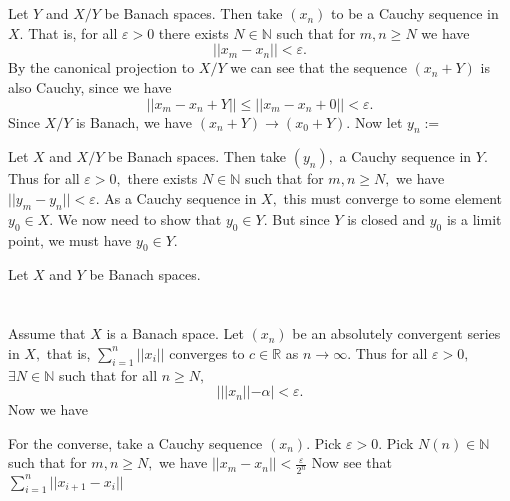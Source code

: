 \documentclass{article}
\begin{document}
\section{} %
Let $Y$ and $X/Y$ be Banach spaces. Then take $(x_n)$ to be a Cauchy sequence in $X.$ That is, for all $\varepsilon > 0$ there exists $N \in \mathbb{N}$ 
such that for $m,n \geq N$ we have $$||x_m-x_n||< \varepsilon.$$
By the canonical projection to $X/Y$ we can see that the sequence $(x_n+Y)$ is also Cauchy, since we have $$||x_m-x_n +Y|| \leq ||x_m-x_n+0|| < \varepsilon. 
$$ Since $X/Y$ is Banach, we have $(x_n+Y) \to (x_0+Y).$ Now let $y_n:= $ 

Let $X$ and $X/Y$ be Banach spaces. Then take $(y_n),$ a Cauchy sequence in $Y.$ Thus for all $\varepsilon > 0,$ there exists $N \in \mathbb{N}$ such that 
for $m,n \geq N,$ we have $||y_m-y_n||< \varepsilon.$ As a Cauchy sequence in $X,$ this must converge to some element $y_0 \in X.$ We now need to show that 
$y_0 \in Y.$ But since $Y$ is closed and $y_0$ is a limit point, we must have $y_0 \in Y.$

Let $X$ and $Y$ be Banach spaces. 
\section{} %
Assume that $X$ is a Banach space. Let $(x_n)$ be an absolutely convergent series in $X,$ that is, $\sum_{i=1}^n||x_i||$ converges to $c \in \mathbb{R}$ as 
$n \to \infty.$ Thus  
for all $\varepsilon > 0,$ $\exists N \in \mathbb{N}$ such that for all $n \geq N,$ $$| ||x_n|| - \alpha| < \varepsilon.$$
Now we have $ $

For the converse, take a Cauchy sequence $(x_n).$ Pick $\varepsilon>0.$ Pick $N(n) \in \mathbb{N}$ such that for $m,n \geq N,$ we have $ ||x_{m}-x_n ||< 
\frac{\varepsilon}{2^n}$ Now see that $\sum_{i=1}^n ||x_{i+1}-x_i||$ 
\end{document}
